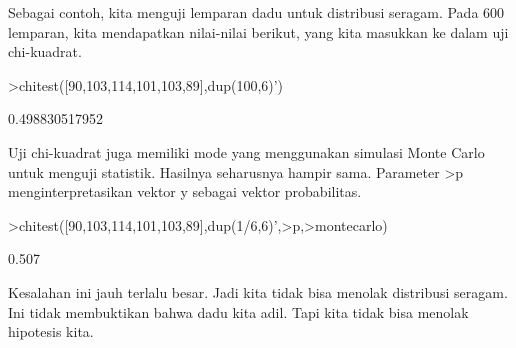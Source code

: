 \documentclass[12pt,arial,letterpaper]{book}
\begin{document}
\begin{eulercomment}
\begin{eulercomment}
\begin{eulercomment}
\begin{eulercomment}
\begin{eulercomment}
\begin{eulercomment}
\begin{eulercomment}
\begin{eulercomment}
\begin{eulercomment}
\begin{eulercomment}
\begin{eulercomment}
\begin{eulercomment}
\begin{eulercomment}
\begin{eulercomment}
\begin{eulercomment}
\begin{eulercomment}
\begin{eulercomment}
\begin{eulercomment}
\begin{eulercomment}
\begin{eulercomment}
\begin{eulercomment}
\begin{eulercomment}
\begin{eulercomment}
\begin{eulercomment}
\begin{eulercomment}
\begin{eulercomment}
\begin{eulercomment}
\begin{eulercomment}
\begin{eulercomment}
\begin{eulercomment}
\begin{eulercomment}
\begin{eulercomment}
\begin{eulercomment}
Sebagai contoh, kita menguji lemparan dadu untuk distribusi seragam.
Pada 600 lemparan, kita mendapatkan nilai-nilai berikut, yang kita
masukkan ke dalam uji chi-kuadrat.
\end{eulercomment}
\begin{eulerprompt}
>chitest([90,103,114,101,103,89],dup(100,6)')
\end{eulerprompt}
\begin{euleroutput}
  0.498830517952
\end{euleroutput}
\begin{eulercomment}
Uji chi-kuadrat juga memiliki mode yang menggunakan simulasi Monte
Carlo untuk menguji statistik. Hasilnya seharusnya hampir sama.
Parameter \textgreater{}p menginterpretasikan vektor y sebagai vektor probabilitas.
\end{eulercomment}
\begin{eulerprompt}
>chitest([90,103,114,101,103,89],dup(1/6,6)',>p,>montecarlo)
\end{eulerprompt}
\begin{euleroutput}
  0.507
\end{euleroutput}
\begin{eulercomment}
Kesalahan ini jauh terlalu besar. Jadi kita tidak bisa menolak
distribusi seragam. Ini tidak membuktikan bahwa dadu kita adil. Tapi
kita tidak bisa menolak hipotesis kita.


\end{eulercomment}
\end{eulercomment}
\end{eulercomment}
\end{eulercomment}
\end{eulercomment}
\end{eulercomment}
\end{eulercomment}
\end{eulercomment}
\end{eulercomment}
\end{eulercomment}
\end{eulercomment}
\end{eulercomment}
\end{eulercomment}
\end{eulercomment}
\end{eulercomment}
\end{eulercomment}
\end{eulercomment}
\end{eulercomment}
\end{eulercomment}
\end{eulercomment}
\end{eulercomment}
\end{eulercomment}
\end{eulercomment}
\end{eulercomment}
\end{eulercomment}
\end{eulercomment}
\end{eulercomment}
\end{eulercomment}
\end{eulercomment}
\end{eulercomment}
\end{eulercomment}
\end{eulercomment}
\end{eulercomment}
\end{document}

